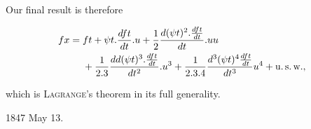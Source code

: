 %

Our final result is therefore

\[\begin{aligned}
fx={}&ft+\psi t\mathord{.}\frac{dft}{dt}\mathord{.}u
+\frac{1}{2}\frac{d(\psi t)^2\mathord{.}\frac{dft}{dt}}{dt}\mathord{.}uu\\
&+\frac{1}{2.3}\frac{dd(\psi t)^3\mathord{.}\frac{dft}{dt}}{dt^2}\mathord{.}u^3
+\frac{1}{2.3.4}\frac{d^3(\psi t)^4\frac{dft}{dt}}{dt^3}u^4+\text{u.\,s.\,w.},
\end{aligned}\]

\noindent which is \textsc{Lagrange}'s theorem in its full generality.

1847 May 13.
